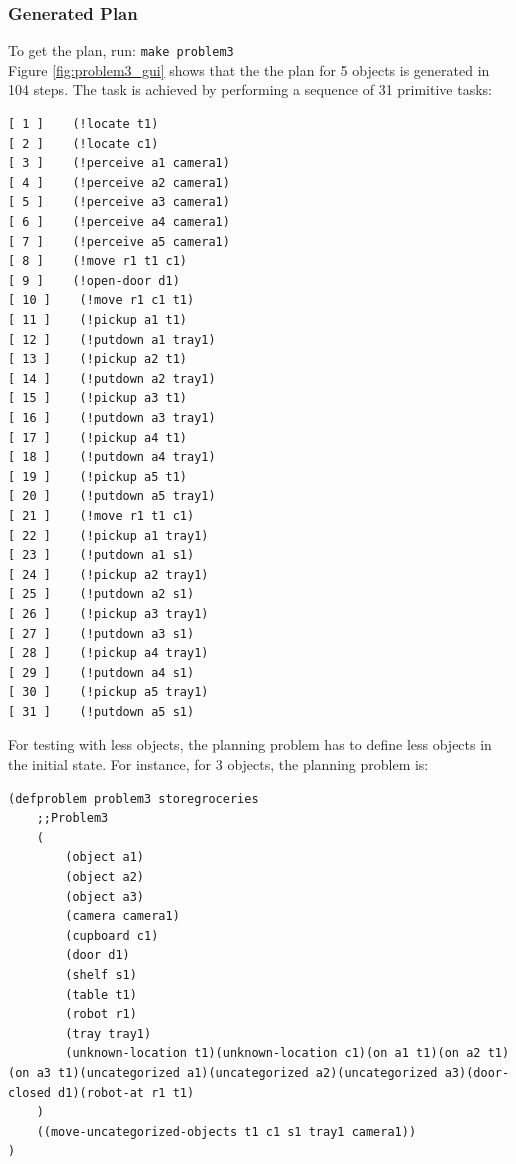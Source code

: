 \documentclass[paper=a4, fontsize=11pt]{scrartcl}
\begin{document}
	\subsubsection*{Generated Plan}

	To get the plan, run: \verb|make problem3| \\

	Figure \ref{fig:problem3_gui} shows that the the plan for 5 objects is generated in 104 steps. The task is achieved by performing a sequence of 31 primitive tasks: \\

	\begin{lstlisting}
[ 1 ]    (!locate t1)
[ 2 ]    (!locate c1)
[ 3 ]    (!perceive a1 camera1)
[ 4 ]    (!perceive a2 camera1)
[ 5 ]    (!perceive a3 camera1)
[ 6 ]    (!perceive a4 camera1)
[ 7 ]    (!perceive a5 camera1)
[ 8 ]    (!move r1 t1 c1)
[ 9 ]    (!open-door d1)
[ 10 ]    (!move r1 c1 t1)
[ 11 ]    (!pickup a1 t1)
[ 12 ]    (!putdown a1 tray1)
[ 13 ]    (!pickup a2 t1)
[ 14 ]    (!putdown a2 tray1)
[ 15 ]    (!pickup a3 t1)
[ 16 ]    (!putdown a3 tray1)
[ 17 ]    (!pickup a4 t1)
[ 18 ]    (!putdown a4 tray1)
[ 19 ]    (!pickup a5 t1)
[ 20 ]    (!putdown a5 tray1)
[ 21 ]    (!move r1 t1 c1)
[ 22 ]    (!pickup a1 tray1)
[ 23 ]    (!putdown a1 s1)
[ 24 ]    (!pickup a2 tray1)
[ 25 ]    (!putdown a2 s1)
[ 26 ]    (!pickup a3 tray1)
[ 27 ]    (!putdown a3 s1)
[ 28 ]    (!pickup a4 tray1)
[ 29 ]    (!putdown a4 s1)
[ 30 ]    (!pickup a5 tray1)
[ 31 ]    (!putdown a5 s1)
	\end{lstlisting}

\vspace{5mm}

For testing with less objects, the planning problem has to define less objects in the initial state. For instance, for 3 objects, the planning problem is: \\

\begin{lstlisting}
(defproblem problem3 storegroceries
	;;Problem3
	(
		(object a1)
		(object a2)
		(object a3)
		(camera camera1)
		(cupboard c1)
		(door d1)
		(shelf s1)
		(table t1)
		(robot r1)
		(tray tray1)
		(unknown-location t1)(unknown-location c1)(on a1 t1)(on a2 t1)(on a3 t1)(uncategorized a1)(uncategorized a2)(uncategorized a3)(door-closed d1)(robot-at r1 t1)
	)
	((move-uncategorized-objects t1 c1 s1 tray1 camera1))
)
\end{lstlisting}

\vspace{5mm}
\end{document}
